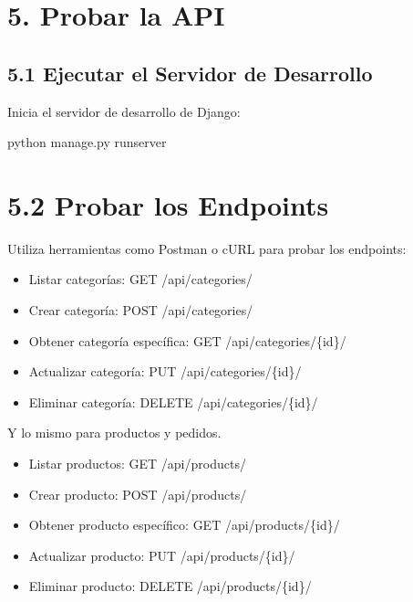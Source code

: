 \documentclass[
  a4paper,
  DIV=11,
  numbers=noendperiod,
  onepage,
  openany]{scrreprt}
\newenvironment{Shaded}{\begin{snugshade}}{\end{snugshade}}
\newcommand{\ExtensionTok}[1]{\textcolor[rgb]{0.00,0.23,0.31}{#1}}
\newcommand{\NormalTok}[1]{\textcolor[rgb]{0.00,0.23,0.31}{#1}}
\providecommand{\tightlist}{%
  \setlength{\itemsep}{0pt}\setlength{\parskip}{0pt}}\usepackage{longtable,booktabs,array}
\begin{document}
\begin{tcolorbox}
\section{5. Probar la API}\label{probar-la-api}

\subsection{5.1 Ejecutar el Servidor de
Desarrollo}\label{ejecutar-el-servidor-de-desarrollo-1}

Inicia el servidor de desarrollo de Django:

\begin{Shaded}
\begin{Highlighting}[]
\ExtensionTok{python}\NormalTok{ manage.py runserver}
\end{Highlighting}
\end{Shaded}

\section{5.2 Probar los Endpoints}\label{probar-los-endpoints}

Utiliza herramientas como Postman o cURL para probar los endpoints:

\begin{itemize}
\tightlist
\item
  Listar categorías: GET /api/categories/
\item
  Crear categoría: POST /api/categories/
\item
  Obtener categoría específica: GET /api/categories/\{id\}/
\item
  Actualizar categoría: PUT /api/categories/\{id\}/
\item
  Eliminar categoría: DELETE /api/categories/\{id\}/
\end{itemize}

Y lo mismo para productos y pedidos.

\begin{itemize}
\tightlist
\item
  Listar productos: GET /api/products/
\item
  Crear producto: POST /api/products/
\item
  Obtener producto específico: GET /api/products/\{id\}/
\item
  Actualizar producto: PUT /api/products/\{id\}/
\item
  Eliminar producto: DELETE /api/products/\{id\}/
\end{itemize}


\end{tcolorbox}
\end{document}
